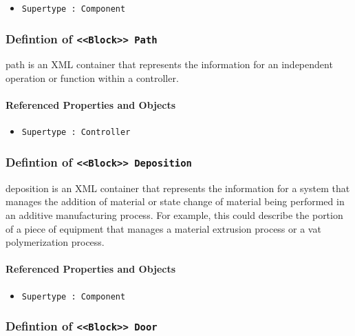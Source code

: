 \begin{itemize}
\item \texttt{Supertype : Component}

\end{itemize}
\FloatBarrier
\subsubsection{Defintion of \texttt{<<Block>> Path}}
  \label{type:Path}

\FloatBarrier

path is an XML container that represents the information for an independent operation or function within a controller.

\FloatBarrier
\paragraph{Referenced Properties and Objects}

\begin{itemize}
\item \texttt{Supertype : Controller}

\end{itemize}
\FloatBarrier
\subsubsection{Defintion of \texttt{<<Block>> Deposition}}
  \label{type:Deposition}

\FloatBarrier

deposition is an XML container that represents the information for a system that manages the addition of material or state change of material being performed in an additive manufacturing process.  For example, this could describe the portion of a piece of equipment that manages a material extrusion process or a vat polymerization process.

\FloatBarrier
\paragraph{Referenced Properties and Objects}

\begin{itemize}
\item \texttt{Supertype : Component}

\end{itemize}
\FloatBarrier
\subsubsection{Defintion of \texttt{<<Block>> Door}}
  \label{type:Door}

